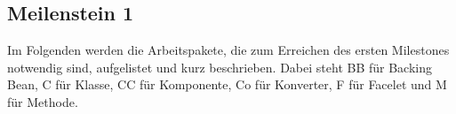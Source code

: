 \documentclass{article}
\begin{document}
\subsection{Meilenstein 1}
Im Folgenden werden die Arbeitspakete, die zum Erreichen des ersten Milestones notwendig sind, aufgelistet und kurz beschrieben. Dabei steht BB für Backing Bean, C für Klasse, CC für Komponente, Co für Konverter, F für Facelet und M für Methode.









\end{document}
